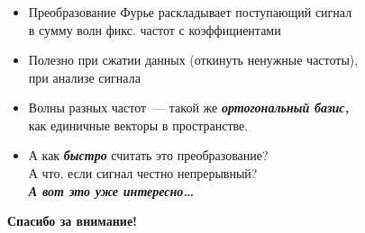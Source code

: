 \documentclass[11pt,aspectratio=169,svgnames]{beamer}
\begin{document}
\begin{frame} \frametitle{\vspace*{-2.4cm}}
\begin{itemize}
	\item Преобразование Фурье раскладывает поступающий сигнал \\
	 в сумму волн фикс. частот с коэффициентами \medskip
	\item Полезно при сжатии данных (откинуть ненужные частоты),\\
	 при анализе сигнала \medskip
	\item Волны разных частот~— такой же {\bfseries\itshape ортогональный базис,}\\
	 как единичные векторы в пространстве. \bigskip
	\item А как {\bfseries\itshape быстро} считать это преобразование? \\
	 А что, если сигнал честно непрерывный? \\
	 {\bfseries\itshape А вот это уже интересно…}
\end{itemize} \bigskip

\begin{center}\Large\bf Спасибо за внимание! \end{center}
\end{frame}
\end{document}
